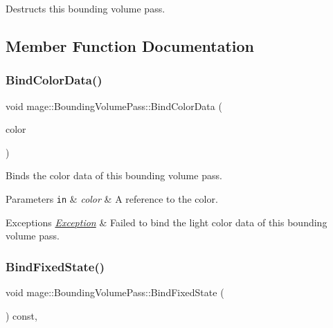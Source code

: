 Destructs this bounding volume pass. 

\subsection{Member Function Documentation}
\hypertarget{classmage_1_1_bounding_volume_pass_a29a98f857f8ae45a0230b96f78f2dcb9}{}\label{classmage_1_1_bounding_volume_pass_a29a98f857f8ae45a0230b96f78f2dcb9} 
\subsubsection{\texorpdfstring{Bind\+Color\+Data()}{BindColorData()}}
{\footnotesize\ttfamily void mage\+::\+Bounding\+Volume\+Pass\+::\+Bind\+Color\+Data (\begin{DoxyParamCaption}\item[{const \hyperlink{structmage_1_1_r_g_b_a}{R\+G\+BA} \&}]{color }\end{DoxyParamCaption})\hspace{0.3cm}{\ttfamily [private]}}

Binds the color data of this bounding volume pass.


\begin{DoxyParams}[1]{Parameters}
\mbox{\tt in}  & {\em color} & A reference to the color. \\
\hline
\end{DoxyParams}

\begin{DoxyExceptions}{Exceptions}
{\em \hyperlink{classmage_1_1_exception}{Exception}} & Failed to bind the light color data of this bounding volume pass. \\
\hline
\end{DoxyExceptions}
\hypertarget{classmage_1_1_bounding_volume_pass_ab38a107beb5481e923526d51e9fdfbe2}{}\label{classmage_1_1_bounding_volume_pass_ab38a107beb5481e923526d51e9fdfbe2} 
\subsubsection{\texorpdfstring{Bind\+Fixed\+State()}{BindFixedState()}}
{\footnotesize\ttfamily void mage\+::\+Bounding\+Volume\+Pass\+::\+Bind\+Fixed\+State (\begin{DoxyParamCaption}{ }\end{DoxyParamCaption}) const\hspace{0.3cm}{\ttfamily [private]}, {\ttfamily [noexcept]}}

